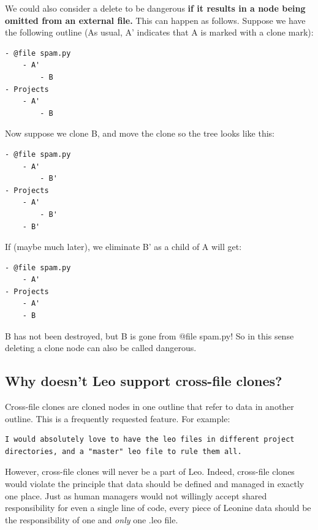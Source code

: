 \documentclass[a4paper,10pt,english]{sphinxmanual}
\begin{document}
We could also consider a delete to be dangerous \textbf{if it results in a node being
omitted from an external file.} This can happen as follows. Suppose we have the
following outline (As usual, A' indicates that A is marked with a clone mark):

\begin{Verbatim}[commandchars=\\\{\}]
- @file spam.py
    - A'
        - B
- Projects
    - A'
        - B
\end{Verbatim}

Now suppose we clone B, and move the clone so the tree looks like this:

\begin{Verbatim}[commandchars=\\\{\}]
- @file spam.py
    - A'
        - B'
- Projects
    - A'
        - B'
    - B'
\end{Verbatim}

If (maybe much later), we eliminate B' as a child of A will get:

\begin{Verbatim}[commandchars=\\\{\}]
- @file spam.py
    - A'
- Projects
    - A'
    - B
\end{Verbatim}

B has not been destroyed, but B is gone from @file spam.py! So in this sense deleting a clone node can also be called dangerous.


\subsection{Why doesn't Leo support cross-file clones?}
\label{FAQ:why-doesn-t-leo-support-cross-file-clones}
Cross-file clones are cloned nodes in one outline that refer to data in another
outline. This is a frequently requested feature. For example:

\begin{Verbatim}[commandchars=\\\{\}]
I would absolutely love to have the leo files in different project
directories, and a "master" leo file to rule them all.
\end{Verbatim}

However, cross-file clones will never be a part of Leo. Indeed, cross-file
clones would violate the principle that data should be defined and managed in
exactly one place. Just as human managers would not willingly accept shared
responsibility for even a single line of code, every piece of Leonine data
should be the responsibility of one and \emph{only} one .leo file.
\end{document}
